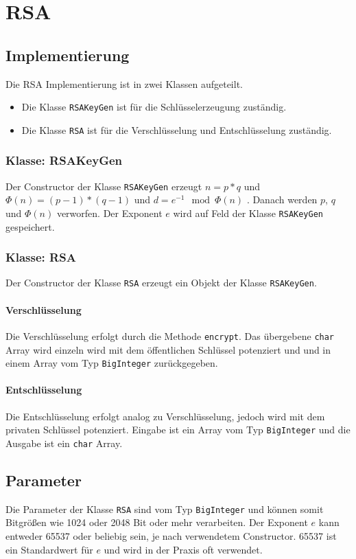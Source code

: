 \chapter{RSA}

\section{Implementierung}
Die RSA Implementierung ist in zwei Klassen aufgeteilt.
\begin{itemize}
	\item Die Klasse \texttt{RSAKeyGen} ist für die Schlüsselerzeugung zuständig.
	\item Die Klasse \texttt{RSA} ist für die Verschlüsselung und Entschlüsselung zuständig.
\end{itemize}

\subsection{Klasse: RSAKeyGen}
Der Constructor der Klasse \texttt{RSAKeyGen} erzeugt $n = p*q$ und $\Phi(n) = (p-1)*(q-1)$ und $d = e^{-1} \mod \Phi(n)$ \cite{rfc8017}. Danach werden $p$, $q$ und $\Phi(n)$ verworfen. Der Exponent $e$ wird auf Feld der Klasse \texttt{RSAKeyGen} gespeichert.

\subsection{Klasse: RSA}
Der Constructor der Klasse \texttt{RSA} erzeugt ein Objekt der Klasse \texttt{RSAKeyGen}.

\subsubsection{Verschlüsselung}
Die Verschlüsselung erfolgt durch die Methode \texttt{encrypt}. Das übergebene \texttt{char} Array wird einzeln wird mit dem öffentlichen Schlüssel potenziert \cite{rfc8017} und und in einem Array vom Typ \texttt{BigInteger} zurückgegeben.

\subsubsection{Entschlüsselung}
Die Entschlüsselung erfolgt analog zu Verschlüsselung, jedoch wird mit dem privaten Schlüssel potenziert. Eingabe ist ein Array vom Typ \texttt{BigInteger} und die Ausgabe ist ein \texttt{char} Array.

\section{Parameter}
Die Parameter der Klasse \texttt{RSA} sind vom Typ \texttt{BigInteger} und können somit Bitgrößen wie 1024 oder 2048 Bit oder mehr verarbeiten. Der Exponent $e$ kann entweder 65537 oder beliebig sein, je nach verwendetem Constructor. 65537 ist ein Standardwert für $e$ und wird in der Praxis oft verwendet.

